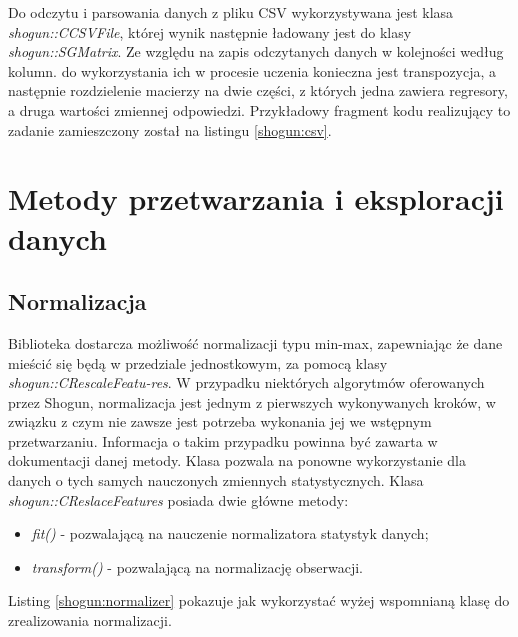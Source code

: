 Do odczytu i parsowania danych z pliku CSV wykorzystywana jest klasa \textit{shogun::CCSVFile}, której wynik następnie ładowany jest do klasy \textit{shogun::SGMatrix}. Ze względu na zapis odczytanych danych w kolejności według kolumn. do wykorzystania ich w procesie uczenia konieczna jest transpozycja, a następnie rozdzielenie macierzy na dwie części, z których jedna zawiera regresory, a druga wartości zmiennej odpowiedzi. Przykładowy fragment kodu realizujący to zadanie zamieszczony został na listingu \ref{shogun:csv}.


\section{Metody przetwarzania i eksploracji danych}

\subsection{Normalizacja}

     
Biblioteka dostarcza możliwość normalizacji typu min-max, zapewniając że dane mieścić się będą w przedziale jednostkowym, za pomocą klasy \textit{shogun::CRescaleFeatu-res}. W przypadku niektórych algorytmów oferowanych przez Shogun, normalizacja jest jednym z pierwszych wykonywanych kroków, w związku z czym nie zawsze jest potrzeba wykonania jej we wstępnym przetwarzaniu. Informacja o takim przypadku powinna być zawarta w dokumentacji danej metody. Klasa pozwala na ponowne wykorzystanie dla danych o tych samych nauczonych zmiennych statystycznych. Klasa \textit{shogun::CReslaceFeatures} posiada dwie główne metody:

\begin{itemize}
	\item \textit{fit()} - pozwalającą na nauczenie normalizatora statystyk danych;
	\item \textit{transform()} - pozwalającą na normalizację obserwacji.
\end{itemize}

Listing \ref{shogun:normalizer} pokazuje jak wykorzystać wyżej wspomnianą klasę do zrealizowania normalizacji.


